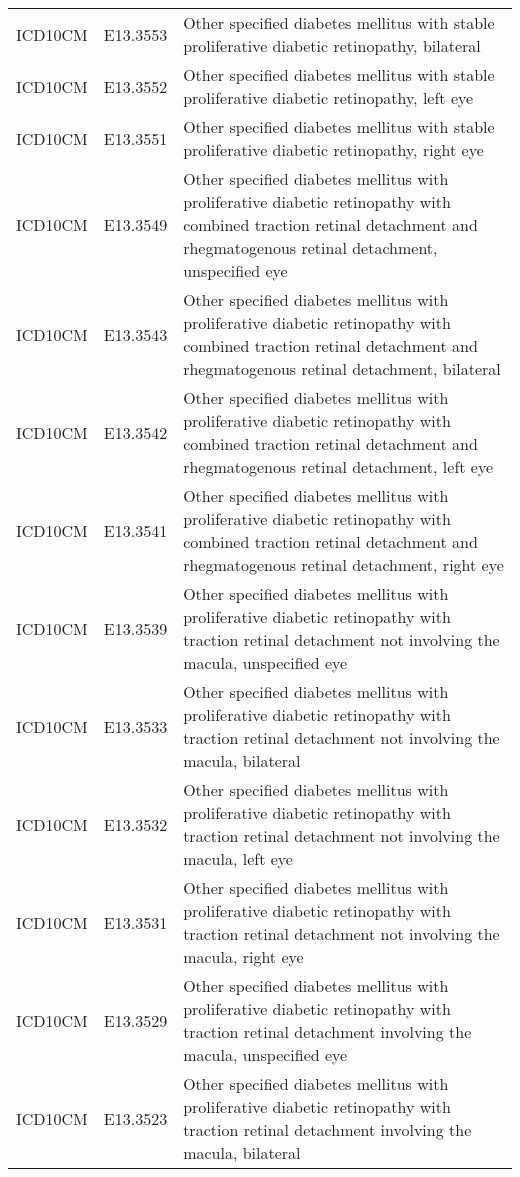 \begin{table}[ht]
\begin{tabular}{lll}
  ICD10CM & E13.3553 & Other specified diabetes mellitus with stable proliferative diabetic retinopathy, bilateral \\ 
  ICD10CM & E13.3552 & Other specified diabetes mellitus with stable proliferative diabetic retinopathy, left eye \\ 
  ICD10CM & E13.3551 & Other specified diabetes mellitus with stable proliferative diabetic retinopathy, right eye \\ 
  ICD10CM & E13.3549 & Other specified diabetes mellitus with proliferative diabetic retinopathy with combined traction retinal detachment and rhegmatogenous retinal detachment, unspecified eye \\ 
  ICD10CM & E13.3543 & Other specified diabetes mellitus with proliferative diabetic retinopathy with combined traction retinal detachment and rhegmatogenous retinal detachment, bilateral \\ 
  ICD10CM & E13.3542 & Other specified diabetes mellitus with proliferative diabetic retinopathy with combined traction retinal detachment and rhegmatogenous retinal detachment, left eye \\ 
  ICD10CM & E13.3541 & Other specified diabetes mellitus with proliferative diabetic retinopathy with combined traction retinal detachment and rhegmatogenous retinal detachment, right eye \\ 
  ICD10CM & E13.3539 & Other specified diabetes mellitus with proliferative diabetic retinopathy with traction retinal detachment not involving the macula, unspecified eye \\ 
  ICD10CM & E13.3533 & Other specified diabetes mellitus with proliferative diabetic retinopathy with traction retinal detachment not involving the macula, bilateral \\ 
  ICD10CM & E13.3532 & Other specified diabetes mellitus with proliferative diabetic retinopathy with traction retinal detachment not involving the macula, left eye \\ 
  ICD10CM & E13.3531 & Other specified diabetes mellitus with proliferative diabetic retinopathy with traction retinal detachment not involving the macula, right eye \\ 
  ICD10CM & E13.3529 & Other specified diabetes mellitus with proliferative diabetic retinopathy with traction retinal detachment involving the macula, unspecified eye \\ 
  ICD10CM & E13.3523 & Other specified diabetes mellitus with proliferative diabetic retinopathy with traction retinal detachment involving the macula, bilateral \\ 

\end{tabular}
\end{table}
